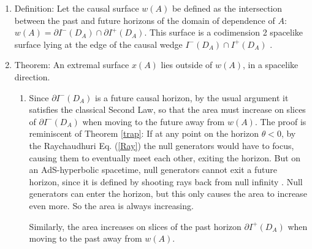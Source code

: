 \documentclass[12pt]{article}
\begin{document}
\begin{enumerate}[resume]
\item Definition: Let the causal surface $w(A)$ be defined as the intersection between the past and future horizons of the domain of dependence of $A$: $w(A) = \partial I^-(D_A) \cap \partial I^+(D_A)$.  This surface is a codimension 2 spacelike surface lying at the edge of the causal wedge $I^-(D_A) \cap I^+(D_A)$ \cite{HRT07}.

\item\label{wm} Theorem: An extremal surface $x(A)$ lies outside of $w(A)$, in a spacelike direction. 
	\begin{enumerate}
	\item Since $\partial I^-(D_A)$ is a future causal horizon, by the usual argument \cite{HawkingEllis} it satisfies the classical Second Law, so that the area must increase on slices of $\partial I^-(D_A)$ when moving to the future away from $w(A)$.  The proof is reminiscent of Theorem \ref{trap}: If at any point on the horizon $\theta < 0$, by the Raychaudhuri Eq. (\ref{Ray}) the null generators would have to focus, causing them to eventually meet each other, exiting the horizon.  But on an AdS-hyperbolic spacetime, null generators cannot exit a future horizon, since it is defined by shooting rays back from null infinity \cite{HawkingEllis}.  Null generators can enter the horizon, but this only causes the area to increase even more.  So the area is always increasing.

Similarly, the area increases on slices of the past horizon $\partial I^+(D_A)$ when moving to the past away from $w(A)$.


\end{enumerate}
\end{enumerate}
\end{document}
